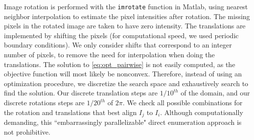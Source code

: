 \documentclass{pnastwo}
\begin{document}
\begin{article}
\begin{materials}
%
Image rotation is performed with the \texttt{imrotate} function in Matlab, using nearest neighbor interpolation to estimate the pixel intensities after rotation.
%
The missing pixels in the rotated image are taken to have zero intensity.
%
The translations are implemented by shifting the pixels (for computational speed, we used periodic boundary conditions).
%
We only consider shifts that correspond to an integer number of pixels, to remove the need for interpolation when doing the translations.
%
The solution to \eqref{eq:opt_pairwise} is not easily computed, as the objective function will most likely be nonconvex.
%
Therefore, instead of using an optimization procedure, we discretize the search space and exhaustively search to find the solution.
%
Our discrete translation steps are $1/10^{th}$ of the domain, and our discrete rotations steps are $1/20^{th}$ of $2 \pi$. 
%
%
We check all possible combinations for the rotation and translations that best align $I_j$ to $I_i$.
%
Although computationally demanding, this ``embarrassingly parallelizable" direct enumeration approach is not prohibitive.
%
%
%

%
%


\end{materials}
\end{article}
\end{document}
